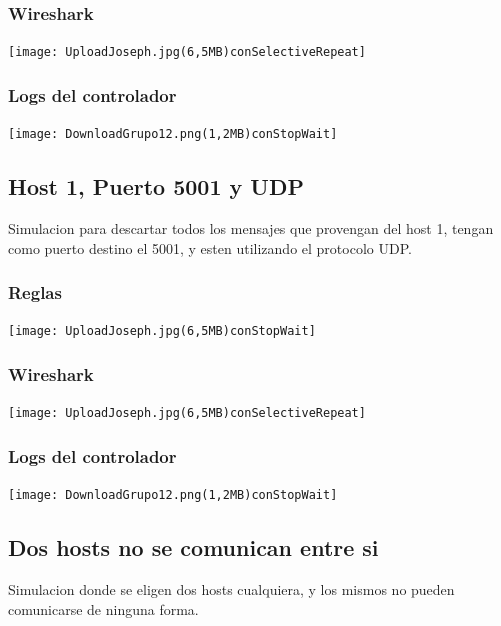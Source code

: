 \documentclass{article}
\begin{document}
\subsubsection{Wireshark}
\begin{center}
\texttt{[image: UploadJoseph.jpg(6,5MB)conSelectiveRepeat]}
\end{center}

\subsubsection{Logs del controlador}
\begin{center}
\texttt{[image: DownloadGrupo12.png(1,2MB)conStopWait]}
\end{center}


\subsection{Host 1, Puerto 5001 y UDP}
Simulacion para descartar todos los mensajes que provengan del host 1, tengan como puerto destino el 5001, y esten utilizando el protocolo UDP.

\subsubsection{Reglas}
\begin{center}
\texttt{[image: UploadJoseph.jpg(6,5MB)conStopWait]}
\end{center}

\subsubsection{Wireshark}
\begin{center}
\texttt{[image: UploadJoseph.jpg(6,5MB)conSelectiveRepeat]}
\end{center}

\subsubsection{Logs del controlador}
\begin{center}
\texttt{[image: DownloadGrupo12.png(1,2MB)conStopWait]}
\end{center}

\subsection{Dos hosts no se comunican entre si}
Simulacion donde se eligen dos hosts cualquiera, y los mismos no pueden comunicarse de ninguna forma.
\end{document}

